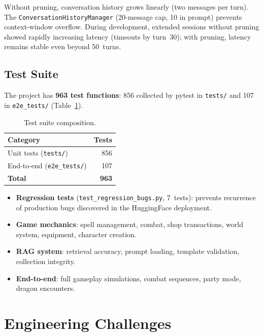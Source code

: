 \documentclass[12pt,a4paper]{article}
\begin{document}
Without pruning, conversation history grows linearly (two messages per turn).
The \texttt{ConversationHistoryManager} (20-message cap, 10 in prompt)
prevents context-window overflow. During development, extended sessions
without pruning showed rapidly increasing latency (timeouts by turn~30);
with pruning, latency remains stable even beyond 50~turns.

\subsection{Test Suite}

The project has \textbf{963 test functions}: 856 collected by pytest in
\texttt{tests/} and 107 in \texttt{e2e\_tests/}
(Table~\ref{tab:testsuite}).

\begin{table}[H]
\centering
\caption{Test suite composition.}
\label{tab:testsuite}
\small
\begin{tabular}{lr}
\toprule
\textbf{Category} & \textbf{Tests} \\
\midrule
Unit tests (\texttt{tests/})     & 856 \\
End-to-end (\texttt{e2e\_tests/}) & 107 \\
\midrule
\textbf{Total}                    & \textbf{963} \\
\bottomrule
\end{tabular}
\end{table}

\begin{itemize}[noitemsep]
    \item \textbf{Regression tests} (\texttt{test\_regression\_bugs.py},
          7~tests): prevents recurrence of production bugs discovered in the
          HuggingFace deployment.
    \item \textbf{Game mechanics}: spell management, combat, shop
          transactions, world system, equipment, character creation.
    \item \textbf{RAG system}: retrieval accuracy, prompt loading, template
          validation, collection integrity.
    \item \textbf{End-to-end}: full gameplay simulations, combat sequences,
          party mode, dragon encounters.
\end{itemize}

\section{Engineering Challenges}
\label{sec:challenges}
\end{document}
